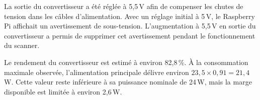 La sortie du convertisseur a été réglée à 5,5\,V afin de compenser les chutes
de tension dans les câbles d'alimentation. Avec un réglage initial à 5\,V, le
Raspberry Pi affichait un avertissement de sous-tension. L'augmentation à
5,5\,V en sortie du convertisseur a permis de supprimer cet avertissement
pendant le fonctionnement du scanner.

Le rendement du convertisseur est estimé à environ 82,8\,\%. À la consommation
maximale observée, l'alimentation principale délivre environ
$23{,}5\times0{,}91=21{,}4$\,W. Cette valeur reste inférieure à sa puissance
nominale de 24\,W, mais la marge disponible est limitée à environ 2,6\,W.
